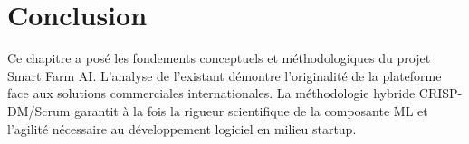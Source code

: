 \section*{Conclusion}
{}
Ce chapitre a posé les fondements conceptuels et méthodologiques du projet
Smart Farm AI. L'analyse de l'existant démontre l'originalité de la plateforme
face aux solutions commerciales internationales. La méthodologie hybride
CRISP-DM/Scrum garantit à la fois la rigueur scientifique de la composante
ML et l'agilité nécessaire au développement logiciel en milieu startup.

